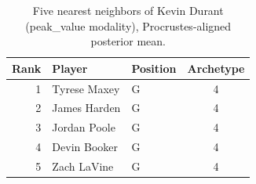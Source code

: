 \begin{table}[htbp]
  \centering\small
  \begin{tabular}{rllc}
    \toprule
    Rank & Player & Position & Archetype \\
    \midrule
    1 & Tyrese Maxey & G & 4 \\
    2 & James Harden & G & 4 \\
    3 & Jordan Poole & G & 4 \\
    4 & Devin Booker & G & 4 \\
    5 & Zach LaVine & G & 4 \\
    \bottomrule
  \end{tabular}
  \caption{Five nearest neighbors of Kevin Durant (peak_value modality), Procrustes-aligned posterior mean.}
  \label{tab:Kevin_Durant_neighbors_peak_value}
\end{table}

